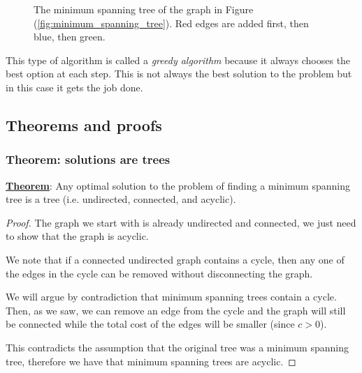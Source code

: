 \documentclass[12pt]{extarticle}
\begin{document}
\begin{figure}[H]
    \centering
    \caption{The minimum spanning tree of the graph in Figure (\ref{fig:minimum_spanning_tree}). Red edges are added first, then blue, then green.}
    \label{fig:minimum_spanning_tree_kruskal}
\end{figure}

This type of algorithm is called a \textit{greedy algorithm} because it always chooses the best option at each step.
This is not always the best solution to the problem but in this case it gets the job done.

\subsection{Theorems and proofs}

\subsubsection{Theorem: solutions are trees}

\textbf{\underline{Theorem}}: Any optimal solution to the problem of finding a minimum spanning tree is a tree (i.e. undirected, connected, and acyclic).

\begin{proof}
    The graph we start with is already undirected and connected, we just need to show that the graph is acyclic.

    We note that if a connected undirected graph contains a cycle, then any one of the edges in the cycle can be removed without disconnecting the graph.

    We will argue by contradiction that minimum spanning trees contain a cycle. Then, as we saw, we can remove an edge from the cycle and the graph will still be connected while the total cost of the edges will be smaller (since $c > 0$).

    This contradicts the assumption that the original tree was a minimum spanning tree, therefore we have that minimum spanning trees are acyclic.
\end{proof}
\end{document}
